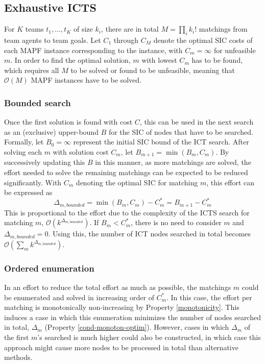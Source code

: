 \documentclass[english,10pt]{article}
\begin{document}
	\subsection{Exhaustive ICTS}
	\label{exhaustive}
	For $K$ teams $t_1,\ldots,t_K$ of size $k_i$, there are in total $M = \prod_{i} k_i!$ matchings from team agents to team goals. Let $C_1$ through $C_M$ denote the optimal SIC costs of each MAPF instance corresponding to the instance, with $C_m = \infty$ for unfeasible $m$. In order to find the optimal solution, $m$ with lowest $C_m$ has to be found, which requires all $M$ to be solved or found to be unfeasible, meaning that $\mathcal{O}(M)$ MAPF instances have to be solved. 
	\subsubsection{Bounded search}
	Once the first solution is found with cost $C$, this can be used in the next search as an (exclusive) upper-bound $B$ for the SIC of nodes that have to be searched. Formally, let $B_0 = \infty$ represent the initial SIC bound of the ICT search. After solving each $m$ with solution cost $C_m$, let $B_{m+1} = \min(B_m,C_m)$. By successively updating this $B$ in this manner, as more matchings are solved, the effort needed to solve the remaining matchings can be expected to be reduced significantly. With $C_m$ denoting the optimal SIC for matching $m$, this effort can be expressed as	
	\[\Delta_{m,bounded} = \min(B_m,C_m) - C^*_m = B_{m+1} - C^*_m\]
	This is proportional to the effort due to the complexity of the ICTS search for matching $m$, $\mathcal{O}(k^{\Delta_{m,bounded}})$.
	If $B_m < C^*_m$, there is no need to consider $m$ and $\Delta_{m,bounded} = 0$.
	Using this, the number of ICT nodes searched in total becomes $\mathcal{O}(\sum_m k^{\Delta_{m,bounded}})$.
	\subsubsection{Ordered enumeration}
	\label{ordered-enum}
	In an effort to reduce the total effort as much as possible, the matchings $m$ could be enumerated and solved in increasing order of $C^*_m$. In this case, the effort per matching is monotonically non-increasing by Property \ref{monotonicity}. This induces a case in which this enumeration minimizes the number of nodes searched in total, $\Delta_m$ (Property \ref{cond-monoton-optim}). However, cases in which $\Delta_m$ of the first $m$'s searched is much higher could also be constructed, in which case this approach might cause more nodes to be processed in total than alternative methods.
	
\end{document}
